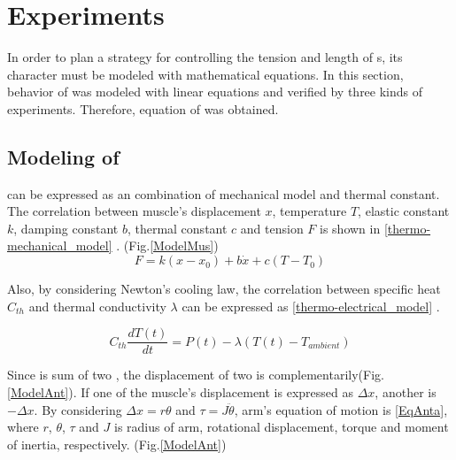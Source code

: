 \section{Experiments}\label{section_modeling}
In order to plan a strategy for controlling the tension and length of \scpnospace s, its character must be modeled with mathematical equations. In this section, behavior of \scp was modeled with linear equations and verified by three kinds of experiments. Therefore, equation of \anta was obtained.

\subsection{Modeling of \ANTA}\label{section_thermo_model}
\scp can be expressed as an combination of mechanical model and thermal constant. The correlation between muscle's displacement $x$, temperature $T$, elastic constant $k$, damping constant $b$, thermal constant $c$ and tension $F$ is shown in \eqref{thermo-mechanical_model} \cite{yip}.
(Fig.\ref{ModelMus})
\begin{equation} \label{thermo-mechanical_model}
F=k(x-x_0) + b\dot{x}+c(T-T_0)
\end{equation}

Also, by considering Newton's cooling law, the correlation between specific heat $C_{th}$ and thermal conductivity $\lambda$ can be expressed as \eqref{thermo-electrical_model} \cite{yip}.

\begin{equation} \label{thermo-electrical_model}
C_{th}\frac{dT(t)}{dt} = P(t) - \lambda(T(t)-T_{ambient})
\end{equation}

Since \anta is sum of two \scpnospace, the displacement of two \scp is complementarily(Fig.\ref{ModelAnt}). If one of the muscle's displacement is expressed as $\Delta{x}$, another is $-\Delta{x}$. By considering $\Delta{x}=r\theta$ and $\tau=J\ddot{\theta}$, arm's equation of motion is \eqref{EqAnta}, where $r$, $\theta$, $\tau$ and $J$ is radius of arm, rotational displacement, torque and moment of inertia, respectively.
(Fig.\ref{ModelAnt})

